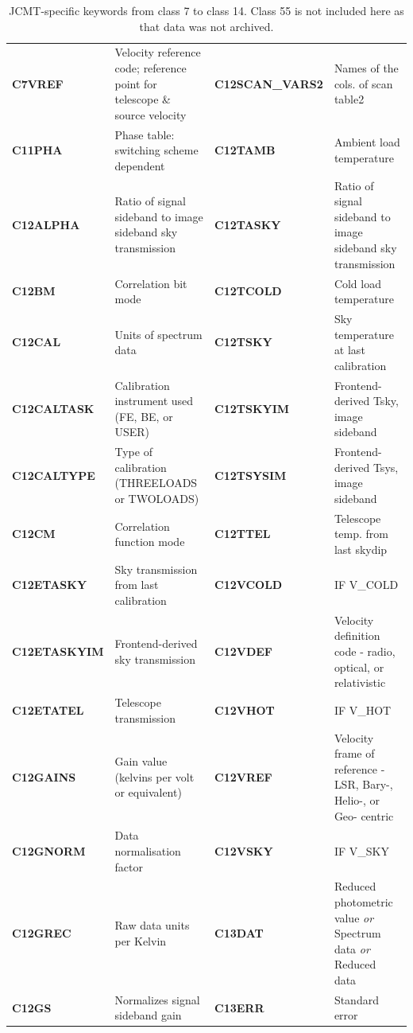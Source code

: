 \documentclass[final,authoryear,5p,times,twocolumn]{elsarticle}
\begin{document}
\begin{table}[t]
\caption{JCMT-specific keywords from class 7 to class 14. Class 55 is not included here as that data was not archived.}
\label{tab:appa3}
\begin{center}
\begin{tabular}{|lp{2.0in}|lp{2.0in}|}
\hline
\textbf{C7VREF} & Velocity reference code; reference point for telescope \& source velocity & \textbf{C12SCAN\_VARS2} & Names of the cols. of scan table2\\
\textbf{C11PHA} & Phase table: switching scheme dependent & \textbf{C12TAMB} & Ambient load temperature\\
\textbf{C12ALPHA} & Ratio of signal sideband to image sideband sky transmission & \textbf{C12TASKY} & Ratio of signal sideband to image sideband sky transmission\\
\textbf{C12BM} & Correlation bit mode & \textbf{C12TCOLD} & Cold load temperature\\
\textbf{C12CAL} & Units of spectrum data & \textbf{C12TSKY} & Sky temperature at last calibration\\
\textbf{C12CALTASK} & Calibration instrument used (FE, BE, or USER) & \textbf{C12TSKYIM} & Frontend-derived Tsky, image sideband\\
\textbf{C12CALTYPE} & Type of calibration (THREELOADS or TWOLOADS) & \textbf{C12TSYSIM} & Frontend-derived Tsys, image sideband\\
\textbf{C12CM} & Correlation function mode & \textbf{C12TTEL} & Telescope temp. from last skydip\\
\textbf{C12ETASKY} & Sky transmission from last calibration & \textbf{C12VCOLD} & IF V\_COLD\\
\textbf{C12ETASKYIM} & Frontend-derived sky transmission & \textbf{C12VDEF} & Velocity definition code - radio, optical, or relativistic\\
\textbf{C12ETATEL} & Telescope transmission & \textbf{C12VHOT} & IF V\_HOT\\
\textbf{C12GAINS} & Gain value (kelvins per volt or equivalent) & \textbf{C12VREF} & Velocity frame of reference - LSR, Bary-, Helio-, or Geo- centric\\
\textbf{C12GNORM} & Data normalisation factor & \textbf{C12VSKY} & IF V\_SKY\\
\textbf{C12GREC} & Raw data units per Kelvin & \textbf{C13DAT} & Reduced photometric value \emph{or} Spectrum data \emph{or} Reduced data\\
\textbf{C12GS} & Normalizes signal sideband gain & \textbf{C13ERR} & Standard error\\

\end{tabular}
\end{center}
\end{table}
\end{document}
